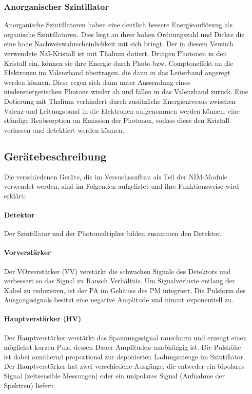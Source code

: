 \documentclass[12pt,listof=totoc]{scrartcl}
\begin{document}
 \subsubsection{Anorganischer Szintillator \label{ASZ}}
 
 Anorganische Szintillatoren haben eine deutlich bessere Energieauflösung als organische Szintillatoren. Dies liegt an ihrer hohen Ordnungszahl und Dichte die eine hohe Nachweiswahrscheinlichkeit mit sich bringt. Der in diesem Versuch verwendete NaI-Kristall ist mit Thalium dotiert. 
 Dringen Photonen in den Kristall ein, können sie ihre Energie durch Photo-bzw. Comptoneffekt an die Elektronen im Valenzband übertragen, die dann in das Leiterband angeregt werden können. Diese regen sich dann unter Aussendung eines niederenergetischen Photons wieder ab und fallen in das Valenzband zurück. Eine Dotierung mit Thalium verhindert durch zusätzliche Energieniveaus zwischen Valenz-und Leitungsband in die Elektronen aufgenommen werden können, eine ständige Reabsorption un Emission der Photonen, sodass diese den Kristall verlassen und detektiert werden können.
 
 \subsection{Gerätebeschreibung \label{Geräte}}
 
 Die verschiedenen Geräte, die im Versuchsaufbau als Teil der NIM-Module verwendet werden, sind im Folgenden aufgelistet und ihre Funktionsweise wird erklärt:
 
 \paragraph{Detektor} Der Szintillator und der Photomultiplier bilden zusammen den Detektor.
 \paragraph{Vorverstärker}
 Der VOrverstärker (VV) verstärkt die schwachen Signale des Detektors und verbessert so
 das Signal zu Rausch Verhältnis. Um Signalverluste entlang der Kabel zu reduzieren, ist der PA im Gehäuse des PM integriert. Die Pulsform des Ausgangssignals besitzt eine negative Amplitude und nimmt exponentiell zu.
 \paragraph{Hauptverstärker (HV)}
 Der Hauptverstärker  verstärkt das Spannungssignal rauscharm und erzeugt einen möglichst kurzen Puls, dessen Dauer Amplituden-unabhängig ist. Die Pulshöhe ist dabei annähernd proportional zur deponierten Ladungsmenge im Szintillator. Der Hauptverstärker hat zwei verschiedene Ausgänge, die entweder ein bipolares Signal (zeitsensible Messungen) oder ein unipolares Signal (Aufnahme der Spektren) liefern.
\end{document}
